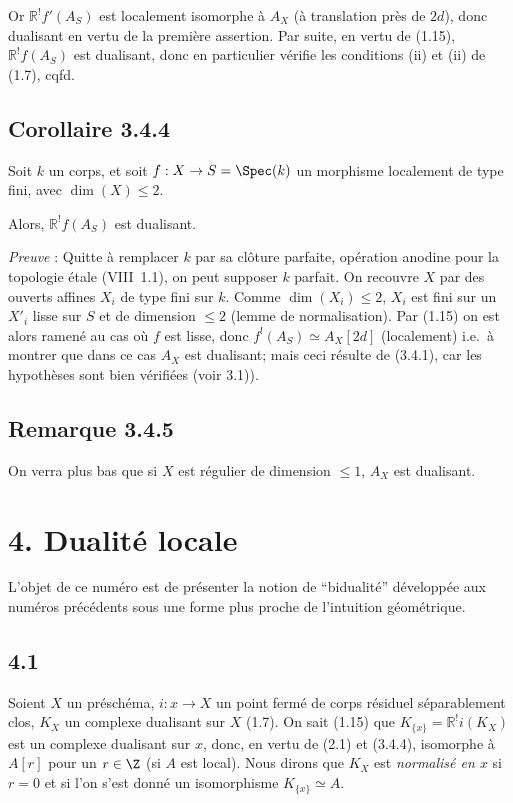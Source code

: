 Or $\mathbb{R}^{!}f'(A_S)$ est localement isomorphe à $A_X$ (à translation près de $2d$), donc dualisant en vertu de la première assertion. Par suite, en vertu de (1.15), $\mathbb{R}^{!}f(A_S)$ est dualisant, donc en particulier vérifie les conditions (ii) et (ii) de (1.7), cqfd.

\subsection*{Corollaire 3.4.4}
Soit $k$ un corps, et soit $f : X \to S = \Spec(k)$ un morphisme localement de type fini, avec $\dim(X) \leqslant 2$.

Alors, $\mathbb{R}^{!}f(A_S)$ est dualisant.

\emph{Preuve} : Quitte à remplacer $k$ par sa clôture parfaite, opération anodine pour la topologie étale (VIII~1.1), on peut supposer $k$ parfait. On recouvre $X$ par des ouverts affines $X_i$ de type fini sur $k$. Comme $\dim(X_i) \leqslant 2$, $X_i$ est fini sur un $X'_i$ lisse sur $S$ et de dimension $\leqslant 2$ (lemme de normalisation). Par (1.15) on est alors ramené au cas où $f$ est lisse, donc $f^{!}(A_S) \simeq A_X[2d]$ (localement) i.e.~à montrer que dans ce cas $A_X$ est dualisant; mais ceci résulte de (3.4.1), car les hypothèses sont bien vérifiées (voir 3.1)).

\subsection*{Remarque 3.4.5}
On verra plus bas que si $X$ est régulier de dimension $\leqslant 1$, $A_X$ est dualisant.

\section*{4. Dualité locale}

L'objet de ce numéro est de présenter la notion de ``bidualité'' développée aux numéros précédents sous une forme plus proche de l'intuition géométrique.

\subsection*{4.1}
Soient $X$ un préschéma, $i:x\to X$ un point fermé de corps résiduel séparablement clos, $K_X$ un complexe dualisant sur $X$ (1.7). On sait (1.15) que $K_{\{x\}}=\mathbb{R}^{!}i(K_X)$ est un complexe dualisant sur $x$, donc, en vertu de (2.1) et (3.4.4), isomorphe à $A[r]$ pour un $r\in\Z$ (si $A$ est local). Nous dirons que $K_X$ est \emph{normalisé en $x$} si $r=0$ et si l'on s'est donné un isomorphisme $K_{\{x\}}\simeq A$.

